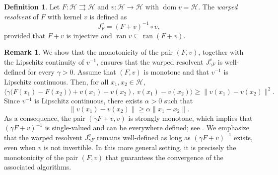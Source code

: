 \documentclass[11pt]{article}
\theoremstyle{definition}
\newtheorem{definition}[theorem]{Definition}
\theoremstyle{definition}
\theoremstyle{definition}
\newtheorem{remark}[theorem]{Remark}
\newcommand{\ran}{\ensuremath{\operatorname{ran}}}
\newcommand{\dom}{\ensuremath{\operatorname{dom}}}
\newcommand{\tcr}{\textcolor{red}}
\def\tcr{ \textcolor{red}}
\begin{document}
\begin{definition}\label{wa}\cite{bc}
Let \( F: \mathcal{H} \rightrightarrows \mathcal{H} \) and \( v: \mathcal{H} \to \mathcal{H} \) with \( \dom v = \mathcal{H} \).  
The \emph{warped resolvent} of \( F \) with kernel \( v \) is defined as  
\[
J_F^v = (F + v)^{-1} \circ v,
\]  
provided that {$F + v$ is injective} and \( \ran v \subseteq \ran(F + v) \).
\end{definition}

%



\begin{remark}\label{wwarp}
{
We show that the monotonicity of the pair \((F,v)\), together with the Lipschitz continuity of \(v^{-1}\), ensures that the warped resolvent \(J_{\gamma F}^v\) is well-defined for every \(\gamma>0\).
Assume that \((F,v)\) is monotone and that \(v^{-1}\) is Lipschitz continuous. Then, for all \(x_1,x_2\in\mathcal{H}\),
\[
\bigl\langle \gamma\bigl(F(x_1)-F(x_2)\bigr)+v(x_1)-v(x_2),\, v(x_1)-v(x_2) \bigr\rangle
\ge \|v(x_1)-v(x_2)\|^2.
\]
Since \(v^{-1}\) is Lipschitz continuous, there exists \(\alpha>0\) such that
\[
\|v(x_1)-v(x_2)\| \ge \alpha \|x_1-x_2\|.
\]
As a consequence, the pair \((\gamma F+v,v)\) is strongly monotone, which implies that \((\gamma F+v)^{-1}\) is single-valued and can be everywhere defined; see \cite[Theorem~6]{acl}.  
}{
We emphasize that the warped resolvent \(J_{\gamma F}^v\) remains well-defined as long as \((\gamma F+v)^{-1}\) exists, even when \(v\) is not invertible. In this more general setting, it is precisely the monotonicity of the pair \((F,v)\) that guarantees the convergence of the associated algorithms.
}
\end{remark}
\end{document}
